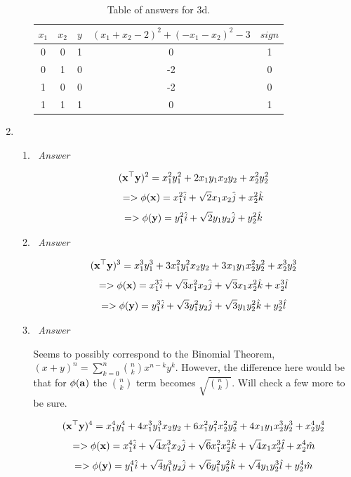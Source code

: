 \documentclass[12pt, fullpage,letterpaper]{article}
\begin{document}
\begin{enumerate}
\begin{enumerate}
		\begin{table}
        	\centering
        	\begin{tabular}{cccc|c}
        		$x_1 $ & $x_2$ & $y$ & $(x_1+x_2-2)^2+(-x_1-x_2)^2-3$ & $sign$\\ 
        		\hline\hline
        		0 & 0 & 1 &  0 & 1 \\ \hline
        		0 & 1 & 0 & -2 & 0 \\ \hline
        		1 & 0 & 0 & -2 & 0 \\ \hline
        		1 & 1 & 1 &  0 & 1 \\ \hline
        	\end{tabular}
        	\caption{Table of answers for 3d.}\label{tb:1}
        \end{table}
	\end{enumerate}
		
	
	\item~
	\begin{enumerate}
		\item~\emph{Answer}
		
		\[
		    ({\bf x}^\top {\bf y})^2 = x_1^2y_1^2 + 2x_1y_1x_2y_2 + x_2^2y_2^2
		\]
		\[
            => \phi({\bf x}) = x_1^2\hat{i} + \sqrt{2}x_1x_2\hat{j} + x_2^2\hat{k}
        \]
		\[
            => \phi({\bf y}) = y_1^2\hat{i} + \sqrt{2}y_1y_2\hat{j} + y_2^2\hat{k}
        \]
        
        
		
		\item~\emph{Answer}
		
		\[
		    ({\bf x}^\top {\bf y})^3 = x_1^3y_1^3 + 3x_1^2y_1^2x_2y_2 + 3x_1y_1x_2^2y_2^2 + x_2^3y_2^3
		\]
		\[
            => \phi({\bf x}) = x_1^3\hat{i} + \sqrt{3}x_1^2x_2\hat{j} + \sqrt{3}x_1x_2^2\hat{k} + x_2^3\hat{l}
        \]
		\[
            => \phi({\bf y}) = y_1^3\hat{i} + \sqrt{3}y_1^2y_2\hat{j} + \sqrt{3}y_1y_2^2\hat{k} + y_2^3\hat{l}
        \]
        
		\item~\emph{Answer}
		
		Seems to possibly correspond to the Binomial Theorem, $(x+y)^n = \sum_{k=0}^n {n \choose k}x^{n-k}y^k$. However, the difference here would be that for $\phi({\bf a})$ the $n \choose k$ term becomes $\sqrt{n \choose k}$. Will check a few more to be sure.
		
		\[
		    ({\bf x}^\top {\bf y})^4 = x_1^4y_1^4 + 4x_1^3y_1^3x_2y_2 + 6x_1^2y_1^2x_2^2y_2^2 + 4x_1y_1x_2^3y_2^3 + x_2^4y_2^4
		\]
		\[
            => \phi({\bf x}) = x_1^4\hat{i} + \sqrt{4}x_1^3x_2\hat{j} + \sqrt{6}x_1^2x_2^2\hat{k} + \sqrt{4}x_1x_2^3\hat{l} + x_2^4\hat{m}
        \]
		\[
            => \phi({\bf y}) = y_1^4\hat{i} + \sqrt{4}y_1^3y_2\hat{j} + \sqrt{6}y_1^2y_2^2\hat{k} + \sqrt{4}y_1y_2^3\hat{l} + y_2^4\hat{m}
        \]
        

\end{enumerate}
\end{enumerate}
\end{document}
